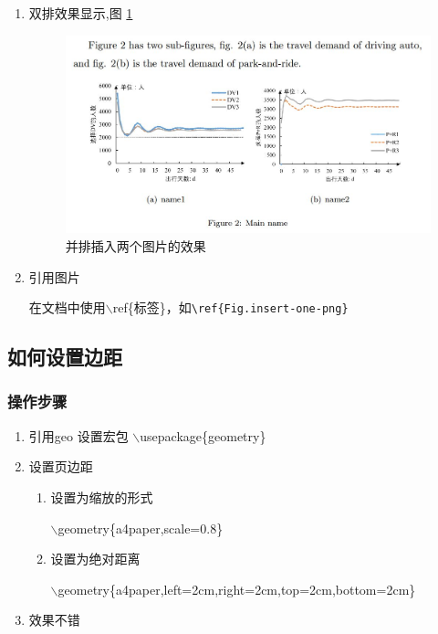 \documentclass[UTF8]{ctexart}
\begin{document}
\begin{enumerate}
    \item 双排效果显示,图 \ref{Fig.Insert_two_pic_demo}
          \begin{figure}[H]
              \centering
              \includegraphics[width=1.0\textwidth]{images/insert-two-pic.jpg}
              \caption{并排插入两个图片的效果}
              \label{Fig.Insert_two_pic_demo}
          \end{figure}

    \item 引用图片

    在文档中使用$\backslash$ref\{标签\}，如\verb!\ref{Fig.insert-one-png}!

\end{enumerate}








\subsection{如何设置边距}
\subsubsection{操作步骤}
\begin{enumerate}
    \item 引用geo 设置宏包
          $\backslash$usepackage\{geometry\}
    \item 设置页边距
          \begin{enumerate}
              \item 设置为缩放的形式

                    $\backslash$geometry\{a4paper,scale=0.8\}
              \item 设置为绝对距离

                    $\backslash$geometry\{a4paper,left=2cm,right=2cm,top=2cm,bottom=2cm\}
          \end{enumerate}
    \item 效果不错
\end{enumerate}
\end{document}
